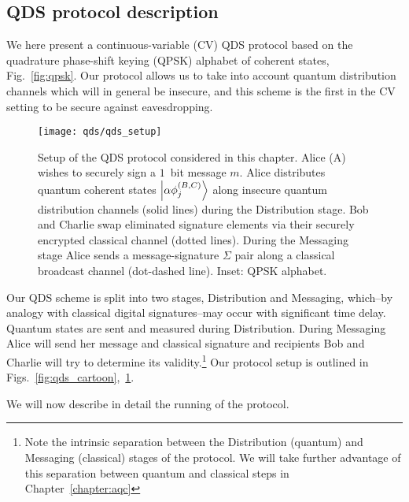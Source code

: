 \subsection{QDS protocol description}

We here present a continuous-variable (CV) QDS protocol based on the quadrature phase-shift keying (QPSK) alphabet of coherent states, Fig.~\ref{fig:qpsk}. %
Our protocol allows us to take into account quantum distribution channels which will in general be insecure, and this scheme is the first in the CV setting to be secure against eavesdropping. %

\begin{figure}[htp]
\centering
\texttt{[image: qds/qds\_setup]}
\caption{\label{fig:qds_setup} Setup of the QDS protocol considered in this chapter. Alice (A) wishes to securely sign a $1$~bit message $m$. Alice distributes quantum coherent states $\ket{\alpha \phi_j^{\left(B, C\right)}}$ along insecure quantum distribution channels (solid lines) during the Distribution stage. Bob and Charlie swap eliminated signature elements via their securely encrypted classical channel (dotted lines). During the Messaging stage Alice sends a message-signature $\Sigma$ pair along a classical broadcast channel (dot-dashed line). Inset: QPSK alphabet.}
\end{figure}


Our QDS scheme is split into two stages, Distribution and Messaging, which--by analogy with classical digital signatures--may occur with significant time delay. Quantum states are sent and measured during Distribution. During Messaging Alice will send her message and classical signature and recipients Bob and Charlie will try to determine its validity.\footnote{Note the intrinsic separation between the Distribution (quantum) and Messaging (classical) stages of the protocol. We will take further advantage of this separation between quantum and classical steps in Chapter~\ref{chapter:aqc}} Our protocol setup is outlined in Figs.~\ref{fig:qds_cartoon},~\ref{fig:qds_setup}. 
\par
\noindent We will now describe in detail the running of the protocol.



